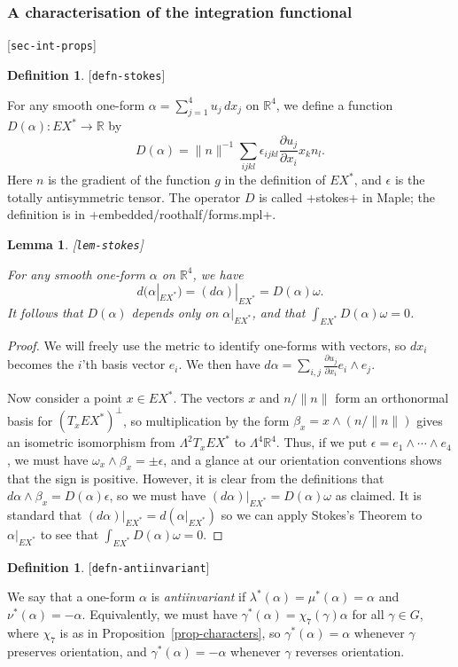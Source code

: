 \documentclass[reqno]{amsart}
\newcommand{\lbl}[1]{\label{#1}\textup{[\texttt{#1}]}\par}
\newcommand{\lbl}{\label}
\newcommand{\Lm}        {\Lambda}
\newcommand{\al}        {\alpha}
\newcommand{\bt}        {\beta}
\newcommand{\gm}        {\gamma}
\newcommand{\ep}        {\epsilon}
\newcommand{\lm}        {\lambda}
\newcommand{\om}        {\omega}
\newcommand{\R}         {{\mathbb{R}}}
\renewcommand{\:}{\colon}
\newtheorem{lemma}[theorem]{Lemma}
\theoremstyle{definition}
\newtheorem{definition}[theorem]{Definition}
\begin{document}
\subsubsection{A characterisation of the integration functional}
\lbl{sec-int-props}

\begin{definition}\lbl{defn-stokes}
 For any smooth one-form $\al=\sum_{j=1}^4u_j\,dx_j$ on $\R^4$, we
 define a function $D(\al)\:EX^*\to\R$ by
 \[ D(\al) =
     \|n\|^{-1} \sum_{ijkl} \ep_{ijkl}
      \frac{\partial u_j}{\partial x_i} x_k n_l.
 \]
 Here $n$ is the gradient of the function $g$ in the definition of
 $EX^*$, and $\ep$ is the totally antisymmetric tensor.  The operator
 $D$ is called \mcode+stokes+ in Maple; the definition is in
 \fname+embedded/roothalf/forms.mpl+.
\end{definition}

\begin{lemma}\lbl{lem-stokes}
 For any smooth one-form $\al$ on $\R^4$, we have
 \[ d(\al|_{EX^*})=(d\al)|_{EX^*}=D(\al)\om. \]
 It follows that $D(\al)$ depends only on $\al|_{EX^*}$, and that
 $\int_{EX^*}D(\al)\om=0$.
\end{lemma}
\begin{proof}
 We will freely use the metric to identify one-forms with vectors, so
 $dx_i$ becomes the $i$'th basis vector $e_i$.  We then have
 $d\al=\sum_{i,j}\frac{\partial u_j}{\partial x_i}e_i\wedge e_j$.

 Now consider a point $x\in EX^*$.  The vectors $x$ and $n/\|n\|$ form
 an orthonormal basis for $(T_xEX^*)^\perp$, so multiplication by the
 form $\bt_x=x\wedge(n/\|n\|)$ gives an isometric isomorphism from
 $\Lm^2T_xEX^*$ to $\Lm^4\R^4$.  Thus, if we put
 $\ep=e_1\wedge\dotsb\wedge e_4$, we must have
 $\om_x\wedge\bt_x=\pm\ep$, and a glance at our orientation
 conventions shows that the sign is positive.  However, it is clear
 from the definitions that $d\al\wedge\bt_x=D(\al)\ep$, so we must
 have $(d\al)|_{EX^*}=D(\al)\om$ as claimed.  It is standard that
 $(d\al)|_{EX^*}=d(\al|_{EX^*})$ so we can apply Stokes's Theorem to
 $\al|_{EX^*}$ to see that $\int_{EX^*}D(\al)\om=0$.
\end{proof}

\begin{definition}\lbl{defn-antiinvariant}
 We say that a one-form $\al$ is \emph{antiinvariant} if
 $\lm^*(\al)=\mu^*(\al)=\al$ and $\nu^*(\al)=-\al$.  Equivalently, we
 must have $\gm^*(\al)=\chi_7(\gm)\al$ for all $\gm\in G$, where
 $\chi_7$ is as in Proposition~\ref{prop-characters}, so
 $\gm^*(\al)=\al$ whenever $\gm$ preserves orientation, and
 $\gm^*(\al)=-\al$ whenever $\gm$ reverses orientation.
\end{definition}
\end{document}
